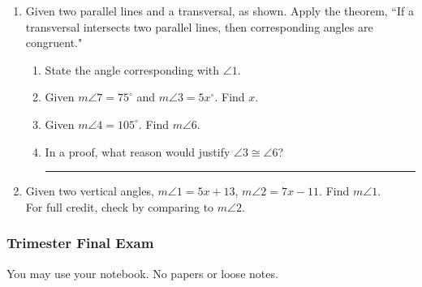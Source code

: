 \documentclass[12pt, oneside]{article}
\begin{document}
\begin{enumerate}
\newpage
\item Given two parallel lines and a transversal, as shown. Apply the theorem, ``If a transversal intersects two parallel lines, then corresponding angles are congruent."
  \begin{center}
  \end{center}
  \begin{enumerate}
    \item State the angle corresponding with $\angle 1$. \bigskip
    \item Given $m\angle 7 = 75^\circ$ and $m\angle 3 = 5x^\circ$. Find $x$. \bigskip
    \item Given $m\angle 4 = 105^\circ$. Find $m\angle 6$. \bigskip
    \item In a proof, what reason would justify $\angle 3 \cong \angle 6$? \rule{6cm}{0.15mm}
  \end{enumerate}

  \item Given two vertical angles, $m \angle 1 = 5x+13$, $m \angle 2 = 7x-11$. Find $m \angle 1$.\\
  For full credit, check by comparing to $m\angle 2$.
      \begin{flushright}
      \end{flushright}

  \end{enumerate}

\newpage %
\setcounter{page}{1}
\subsubsection*{Trimester Final Exam}
You may use your notebook. No papers or loose notes.
\end{document}
